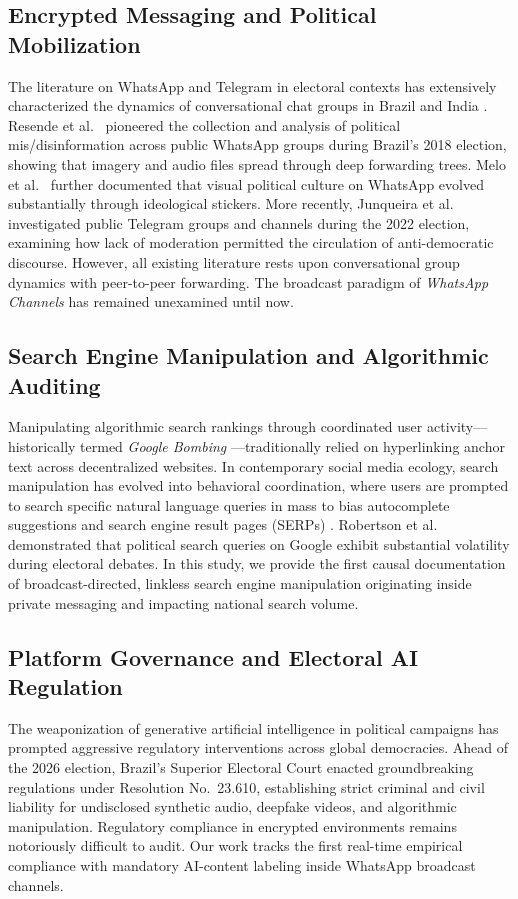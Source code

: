 \documentclass[preprint,12pt]{elsarticle}
\begin{document}
\subsection{Encrypted Messaging and Political Mobilization}
The literature on WhatsApp and Telegram in electoral contexts has extensively characterized the dynamics of conversational chat groups in Brazil and India \cite{resende2019whatsapp,melo2019whatsapp,bastos2020whatsapp}. Resende et al.\ \cite{resende2019whatsapp} pioneered the collection and analysis of political mis/disinformation across public WhatsApp groups during Brazil's 2018 election, showing that imagery and audio files spread through deep forwarding trees. Melo et al.\ \cite{melo2021sticker} further documented that visual political culture on WhatsApp evolved substantially through ideological stickers. More recently, Junqueira et al.\ \cite{junqueira2025telegram} investigated public Telegram groups and channels during the 2022 election, examining how lack of moderation permitted the circulation of anti-democratic discourse. However, all existing literature rests upon conversational group dynamics with peer-to-peer forwarding. The broadcast paradigm of \textit{WhatsApp Channels} has remained unexamined until now.

\subsection{Search Engine Manipulation and Algorithmic Auditing}
Manipulating algorithmic search rankings through coordinated user activity---historically termed \textit{Google Bombing} \cite{bar-ilan2007googlebombing}---traditionally relied on hyperlinking anchor text across decentralized websites. In contemporary social media ecology, search manipulation has evolved into behavioral coordination, where users are prompted to search specific natural language queries in mass to bias autocomplete suggestions and search engine result pages (SERPs) \cite{metaxa2021search}. Robertson et al.\ \cite{robertson2018auditing} demonstrated that political search queries on Google exhibit substantial volatility during electoral debates. In this study, we provide the first causal documentation of broadcast-directed, linkless search engine manipulation originating inside private messaging and impacting national search volume.

\subsection{Platform Governance and Electoral AI Regulation}
The weaponization of generative artificial intelligence in political campaigns has prompted aggressive regulatory interventions across global democracies. Ahead of the 2026 election, Brazil's Superior Electoral Court enacted groundbreaking regulations under Resolution No.\ 23.610, establishing strict criminal and civil liability for undisclosed synthetic audio, deepfake videos, and algorithmic manipulation. Regulatory compliance in encrypted environments remains notoriously difficult to audit. Our work tracks the first real-time empirical compliance with mandatory AI-content labeling inside WhatsApp broadcast channels.
\end{document}
